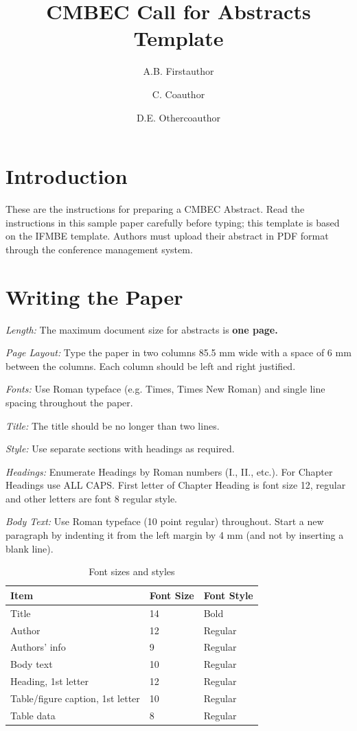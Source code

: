 \documentclass[nouppercase]{cmbec}
\title{CMBEC Call for Abstracts Template}
\affiliation{Institution/Department, Affiliation, City, Country }{FIRSTAFF}
\affiliation{Institution/Department, Affiliation, City, Country }{SECONDAFF}
\author{A.B. Firstauthor}{FIRSTAFF}
\author{C. Coauthor}{SECONDAFF}
\author{D.E. Othercoauthor}{FIRSTAFF}
\begin{document}
\maketitle


\section{Introduction}

These are the instructions for preparing a CMBEC Abstract. Read the instructions in this sample paper carefully before typing; this template is based on the IFMBE template. Authors must upload their abstract in PDF format through the conference management system.

\section{Writing the Paper}

\textit{Length:} The maximum document size for abstracts is \textbf{one page.} 

\textit{Page Layout:} Type the paper in two columns 85.5 mm wide with a space of 6 mm between the columns. Each column should be left and right justified.

\textit{Fonts:} Use Roman typeface (e.g. Times, Times New Roman) and single line spacing throughout the paper.

\textit{Title:} The title should be no longer than two lines. 

\textit{Style:} Use separate sections with headings as required. 

\textit{Headings:} Enumerate Headings by Roman numbers (I., II., etc.). For Chapter Headings use ALL CAPS. First letter of Chapter Heading is font size 12, regular and other letters are font 8 regular style. 

\textit{Body Text:} Use Roman typeface (10 point regular) throughout. Start a new paragraph by indenting it from the left margin by 4 mm (and not by inserting a blank line). 

\begin{table}[ht]
  \footnotesize %
  \caption{Font sizes and styles}
  \begin{tabular}{p{3.90cm}p{1.40cm}p{1.90cm}}
     \hline
     \normalfont Item & Font Size & Font Style \\
     \hline
     Title & 14 & Bold\\
     Author & 12 & Regular\\
     Authors' info & 9 & Regular\\
     Body text & 10 & Regular\\
     Heading, 1st letter & 12 & Regular\\
     Table/figure caption, 1st letter & 10 & Regular\\
     Table data & 8 & Regular\\
     \hline
  \end{tabular}
  \label{table1}
\end{table}
\end{document}
